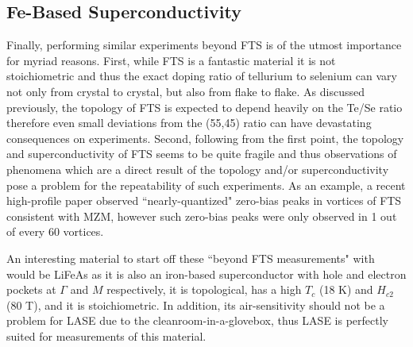 \subsection{Fe-Based Superconductivity}
Finally, performing similar experiments beyond \ac{FTS} is of the utmost importance for myriad reasons. First, while \ac{FTS} is a fantastic material it is not stoichiometric and thus the exact doping ratio of tellurium to selenium can vary not only from crystal to crystal, but also from flake to flake. As discussed previously, the topology of \ac{FTS} is expected to depend heavily on the Te/Se ratio therefore even small deviations from the (55,45) ratio can have devastating consequences on experiments. Second, following from the first point, the topology and superconductivity of \ac{FTS} seems to be quite fragile and thus observations of phenomena which are a direct result of the topology and/or superconductivity pose a problem for the repeatability of such experiments. As an example, a recent high-profile paper observed ``nearly-quantized" zero-bias peaks in vortices of \ac{FTS} consistent with \ac{MZM}, however such zero-bias peaks were only observed in 1 out of every 60 vortices\cite{Zhu2020, frolov2021}.\par
An interesting material to start off these ``beyond \ac{FTS} measurements" with would be LiFeAs as it is also an iron-based superconductor with hole and electron pockets at $\Gamma$ and $M$ respectively, it is topological, has a high $T_{c}$ (18 K) and $H_{c2}$ (80 T), and it is stoichiometric\cite{Nag2016, Zhang2019_2, Tapp2008}. In addition, its air-sensitivity should not be a problem for LASE due to the cleanroom-in-a-glovebox, thus LASE is perfectly suited for measurements of this material. 